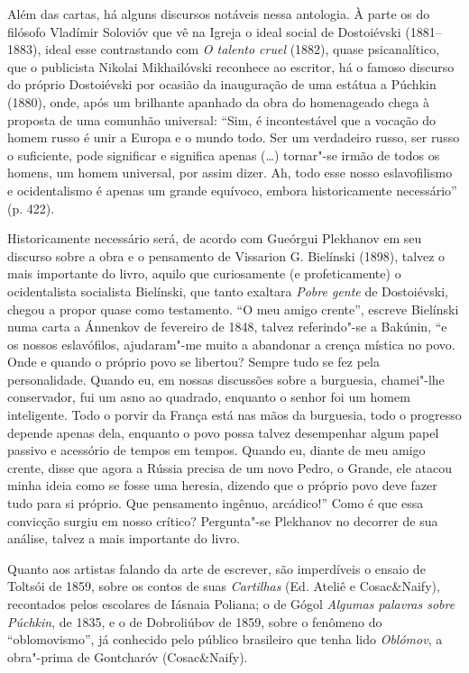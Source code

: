 Além das cartas, há alguns discursos notáveis nessa antologia. À parte
os do filósofo Vladímir Solovióv que vê na Igreja o ideal social de
Dostoiévski (1881--1883), ideal esse contrastando com \emph{O talento
cruel} (1882), quase psicanalítico, que o publicista Nikolai Mikhailóvski reconhece
ao escritor, há o famoso discurso do próprio Dostoiévski por ocasião da
inauguração de uma estátua a Púchkin (1880), onde, após um brilhante
apanhado da obra do homenageado chega à proposta de uma comunhão
universal: ``Sim, é incontestável que a vocação do homem russo é unir a
Europa e o mundo todo. Ser um verdadeiro russo, ser russo o suficiente,
pode significar e significa apenas (\ldots{}) tornar"-se irmão de todos os
homens, um homem universal, por assim dizer. Ah, todo esse nosso
eslavofilismo e ocidentalismo é apenas um grande equívoco, embora
historicamente necessário'' (p. 422).

Historicamente necessário será, de acordo com Gueórgui Plekhanov em seu
discurso sobre a obra e o pensamento de Vissarion G. Bielínski (1898),
talvez o mais importante do livro, aquilo que curiosamente (e
profeticamente) o ocidentalista socialista Bielínski, que tanto
exaltara \emph{Pobre gente} de Dostoiévski, chegou a propor quase como
testamento. ``O meu amigo crente'', escreve Bielínski numa carta a
Ánnenkov de fevereiro de 1848, talvez referindo"-se a Bakúnin, ``e os
nossos eslavófilos, ajudaram"-me muito a abandonar a crença mística no
povo. Onde e quando o próprio povo se libertou? Sempre tudo se fez pela
personalidade. Quando eu, em nossas discussões sobre a burguesia,
chamei"-lhe conservador, fui um asno ao quadrado, enquanto o senhor foi
um homem inteligente. Todo o porvir da França está nas mãos da
burguesia, todo o progresso depende apenas dela, enquanto o povo possa
talvez desempenhar algum papel passivo e acessório de tempos em tempos.
Quando eu, diante de meu amigo crente, disse que agora a Rússia precisa
de um novo Pedro, o Grande, ele atacou minha ideia como se fosse uma
heresia, dizendo que o próprio povo deve fazer tudo para si próprio. Que
pensamento ingênuo, arcádico!'' Como é que essa convicção surgiu em
nosso crítico? Pergunta"-se Plekhanov no decorrer de sua
análise, talvez a mais importante do livro.

Quanto aos artistas falando da arte de escrever, são imperdíveis o
ensaio de Toltsói de 1859, sobre os contos de suas \emph{Cartilhas} (Ed.
Ateliê e Cosac\&Naify), recontados pelos escolares de Iásnaia Poliana; o
de Gógol \emph{Algumas palavras sobre Púchkin}, de 1835, e o de Dobroliúbov
de 1859, sobre o fenômeno do ``oblomovismo'', já conhecido pelo público
brasileiro que tenha lido \emph{Oblómov}, a obra"-prima de Gontcharóv
(Cosac\&Naify).

